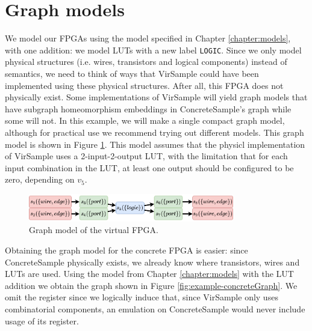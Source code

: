 \section{Graph models}
\label{sec:example-graphmodels}
We model our FPGAs using the model specified in Chapter \ref{chapter:models}, with one addition: we model LUTs with a new label \texttt{LOGIC}. Since we only model physical structures (i.e. wires, transistors and logical components) instead of semantics, we need to think of ways that VirSample could have been implemented using these physical structures. After all, this FPGA does not physically exist. Some implementations of VirSample will yield graph models that have subgraph homeomorphism embeddings in ConcreteSample's graph while some will not. In this example, we will make a single compact graph model, although for practical use we recommend trying out different models. This graph model is shown in Figure \ref{fig:example-virtualGraph}. This model assumes that the physicl implementation of VirSample uses a 2-input-2-output LUT, with the limitation that for each input combination in the LUT, at least one output should be configured to be zero, depending on $v_5$.

\begin{figure}[t]
\centering
\includegraphics[width=0.8\textwidth]{images/endToEnd/virtualFPGAGraph.png}
\caption{Graph model of the virtual FPGA.}
\label{fig:example-virtualGraph}
\end{figure}

Obtaining the graph model for the concrete FPGA is easier: since ConcreteSample physically exists, we already know where transistors, wires and LUTs are used. Using the model from Chapter \ref{chapter:models} with the LUT addition we obtain the graph shown in Figure \ref{fig:example-concreteGraph}. We omit the register since we logically induce that, since VirSample only uses combinatorial components, an emulation on ConcreteSample would never include usage of its register.

